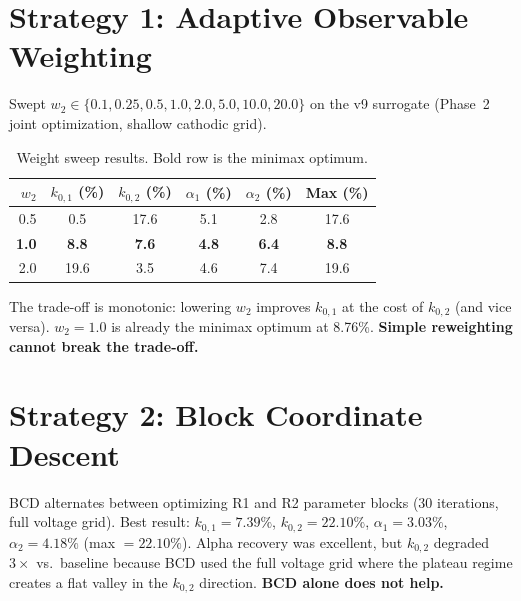 \documentclass[11pt]{article}
\begin{document}
\section{Strategy 1: Adaptive Observable Weighting}

Swept $w_2 \in \{0.1, 0.25, 0.5, 1.0, 2.0, 5.0, 10.0, 20.0\}$ on the v9
surrogate (Phase~2 joint optimization, shallow cathodic grid).

\begin{table}[htbp]
  \centering
  \caption{Weight sweep results.  Bold row is the minimax optimum.}
  \label{tab:weight_sweep}
  \begin{tabular}{r S[round-precision=1] S[round-precision=1]
                    S[round-precision=1] S[round-precision=1]
                    S[round-precision=1]}
    \toprule
    $w_2$ & {$k_{0,1}$ (\%)} & {$k_{0,2}$ (\%)}
          & {$\alpha_1$ (\%)} & {$\alpha_2$ (\%)}
          & {Max (\%)} \\
       &  0.5 & 17.6 &  5.1 &  2.8 & 17.6 \\
    \textbf{1.0}   &  \textbf{8.8} &  \textbf{7.6} &  \textbf{4.8} &  \textbf{6.4} &  \textbf{8.8} \\
    2.0   & 19.6 &  3.5 &  4.6 &  7.4 & 19.6 \\
    \bottomrule
  \end{tabular}
\end{table}

The trade-off is monotonic: lowering $w_2$ improves $k_{0,1}$ at the cost of
$k_{0,2}$ (and vice versa).  $w_2 = 1.0$ is already the minimax optimum at
8.76\%.  \textbf{Simple reweighting cannot break the trade-off.}


\section{Strategy 2: Block Coordinate Descent}

BCD alternates between optimizing R1 and R2 parameter blocks (30 iterations,
full voltage grid).  Best result: $k_{0,1} = 7.39\%$, $k_{0,2} = 22.10\%$,
$\alpha_1 = 3.03\%$, $\alpha_2 = 4.18\%$ (max $= 22.10\%$).  Alpha recovery
was excellent, but $k_{0,2}$ degraded $3\times$ vs.\ baseline because BCD used
the full voltage grid where the plateau regime creates a flat valley in the
$k_{0,2}$ direction.  \textbf{BCD alone does not help.}
\end{document}
